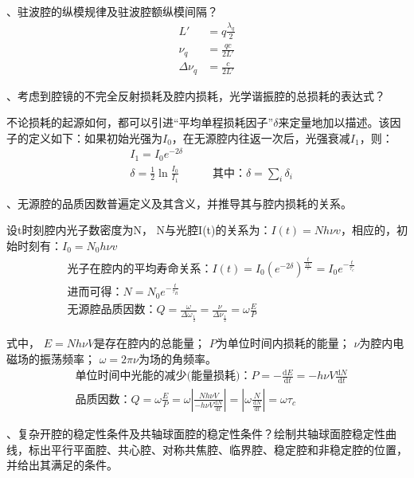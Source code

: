 \documentclass[12pt]{article}
\begin{document}
{、驻波腔的纵模规律及驻波腔额纵模间隔？
}
{\kaishu
\begin{align*}
    L'&=q\frac{\lambda_q}{2}\\
    \nu_q&=\frac{qc}{2L'}\\
    \Delta\nu_q&=\frac{c}{2L'}
\end{align*}
}

{、考虑到腔镜的不完全反射损耗及腔内损耗，光学谐振腔的总损耗的表达式？
}
{\kaishu
\par  
不论损耗的起源如何，都可以引进“平均单程损耗因子”$\delta$来定量地加以描述。该因子的定义如下：如果初始光强为$I_0$，在无源腔内往返一次后，光强衰减$I_1$，则：
\begin{align*}
    &I_1=I_0e^{-2\delta}\\
    &\delta=\frac{1}{2}\ln\frac{I_0}{I_1}
    \quad\quad\quad
    \text{其中：}\delta=\sum_i \delta_i
\end{align*}
}

{、无源腔的品质因数普遍定义及其含义，并推导其与腔内损耗的关系。
}
{\kaishu

设t时刻腔内光子数密度为N，
N与光腔I(t)的关系为：$I(t)=Nh\nu v$，相应的，初始时刻有：$I_0=N_0h\nu v $
\begin{align}
    &\text{光子在腔内的平均寿命关系：}
    I(t)
    =I_0(e^{-2\delta})^{\frac{t}{\frac{2L'}{c}}}
    =I_0e^{-\frac{t}{\tau_c}}\\
    &\text{进而可得：}N=N_0e^{-\frac{t}{\tau_R}}\\
    &\text{无源腔品质因数：}
    Q
    =\frac{\omega}{\Delta\omega_{\frac{1}{2}}}
    =\frac{\nu}{\Delta\nu_{\frac{1}{2}}}
    =\omega\frac{E}{P}
\end{align}
\par 式中，
$E=Nh\nu V$是存在腔内的总能量；
$P$为单位时间内损耗的能量；
$\nu$为腔内电磁场的振荡频率；
$\omega=2\pi\nu$为场的角频率。
\begin{align}
    &\text{单位时间中光能的减少(能量损耗)：}
    P
    =-\frac{\mathrm{d}E}{\mathrm{d}t}
    =-h\nu V\frac{\mathrm{d}N}{\mathrm{d}t}\\
    &\text{品质因数：}Q
    =\omega\frac{E}{P}=
    \omega\left|
    \frac
    {Nh\nu V}
    {-h\nu V\frac{\mathrm{d}N}{\mathrm{d}t}}
    \right|
    =
    \left|\omega\frac{N}{\frac{\mathrm{d}N}{\mathrm{d}t}}\right|
    =\omega\tau_c
\end{align}
}

{、复杂开腔的稳定性条件及共轴球面腔的稳定性条件？绘制共轴球面腔稳定性曲线，标出平行平面腔、共心腔、对称共焦腔、临界腔、稳定腔和非稳定腔的位置，并给出其满足的条件。
}
\end{document}
